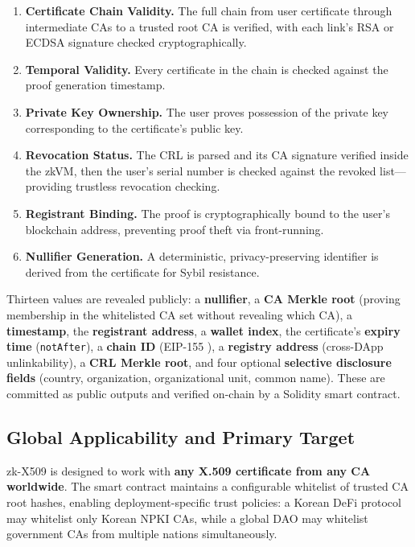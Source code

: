 \documentclass[11pt, a4paper]{article}
\providecommand{\tightlist}{%
  \setlength{\itemsep}{0pt}\setlength{\parskip}{0pt}}
\begin{document}
\begin{enumerate}
\def\labelenumi{\arabic{enumi}.}
\tightlist
\item
  \textbf{Certificate Chain Validity.} The full chain from user
  certificate through intermediate CAs to a trusted root CA is verified,
  with each link's RSA or ECDSA signature checked cryptographically.
\item
  \textbf{Temporal Validity.} Every certificate in the chain is checked
  against the proof generation timestamp.
\item
  \textbf{Private Key Ownership.} The user proves possession of the
  private key corresponding to the certificate's public key.
\item
  \textbf{Revocation Status.} The CRL is parsed and its CA signature
  verified inside the zkVM, then the user's serial number is checked
  against the revoked list---providing trustless revocation checking.
\item
  \textbf{Registrant Binding.} The proof is cryptographically bound to
  the user's blockchain address, preventing proof theft via
  front-running.
\item
  \textbf{Nullifier Generation.} A deterministic, privacy-preserving
  identifier is derived from the certificate for Sybil resistance.
\end{enumerate}

Thirteen values are revealed publicly: a \textbf{nullifier}, a
\textbf{CA Merkle root} (proving membership in the whitelisted CA set
without revealing which CA), a \textbf{timestamp}, the
\textbf{registrant address}, a \textbf{wallet index}, the certificate's
\textbf{expiry time} (\texttt{notAfter}), a \textbf{chain ID} (EIP-155
\cite{ref28}), a \textbf{registry address} (cross-DApp unlinkability), a
\textbf{CRL Merkle root}, and four optional \textbf{selective disclosure
fields} (country, organization, organizational unit, common name). These
are committed as public outputs and verified on-chain by a Solidity
smart contract.

\subsection{Global Applicability and Primary
Target}\label{global-applicability-and-primary-target}

zk-X509 is designed to work with \textbf{any X.509 certificate from any
CA worldwide}. The smart contract maintains a configurable whitelist of
trusted CA root hashes, enabling deployment-specific trust policies: a
Korean DeFi protocol may whitelist only Korean NPKI CAs, while a global
DAO may whitelist government CAs from multiple nations simultaneously.
\end{document}
